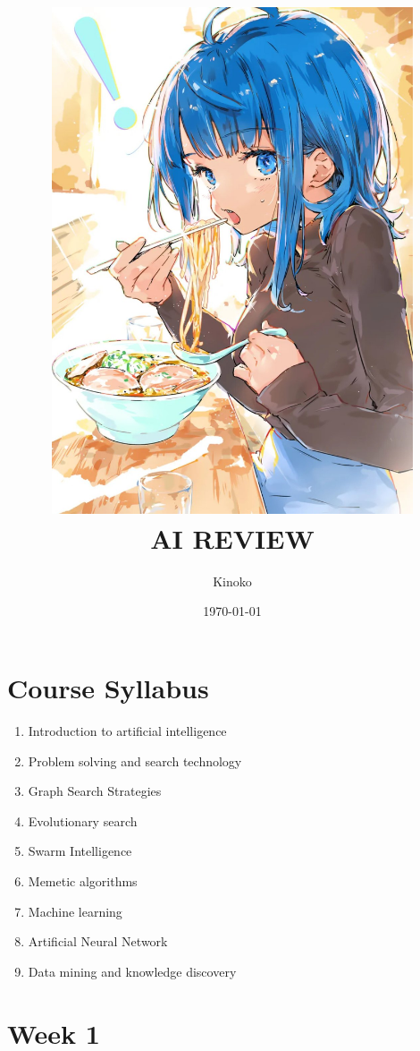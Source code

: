 \documentclass[a4paper, 12pt]{article}
\title{
    \includegraphics[width=0.8\textwidth]{Yanami.JPG}\\  %
    AI REVIEW
}
\author{Kinoko}
\date{\today}
\begin{document}

\begin{titlepage}  
    \maketitle
\end{titlepage}

\fancyhead[R]{}  %

\tableofcontents
\newpage  %


\section*{Course Syllabus}  %
    \begin{enumerate}
        \item Introduction to artificial intelligence
        \item Problem solving and search technology
        \item Graph Search Strategies
        \item Evolutionary search
        \item Swarm Intelligence
        \item Memetic algorithms 
        \item Machine learning
        \item Artificial Neural Network
        \item Data mining and knowledge discovery
    \end{enumerate}

\newpage

\setcounter{section}{0}

\section{Week 1}
\end{document}
